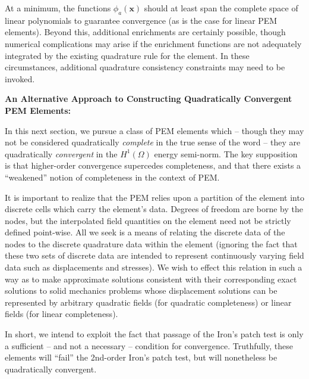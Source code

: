 \documentclass[11pt]{article} %
\begin{document}
At a minimum, the functions $\phi_a (\mathbf{x})$ should at least span the complete space of linear polynomials to guarantee convergence (as is the case for linear PEM elements). Beyond this, additional enrichments are certainly possible, though numerical complications may arise if the enrichment functions are not adequately integrated by the existing quadrature rule for the element. In these circumstances, additional quadrature consistency constraints may need to be invoked.

\newpage

\begin{center}
\textbf{An Alternative Approach to Constructing Quadratically Convergent PEM Elements:}
\end{center}

In this next section, we pursue a class of PEM elements which -- though they may not be considered quadratically \textit{complete} in the true sense of the word -- they are quadratically \textit{convergent} in the $H^1 (\Omega)$ energy semi-norm. The key supposition is that higher-order convergence supercedes completeness, and that there exists a ``weakened'' notion of completeness in the context of PEM.

It is important to realize that the PEM relies upon a partition of the element into discrete cells which carry the element's data. Degrees of freedom are borne by the nodes, but the interpolated field quantities on the element need not be strictly defined point-wise. All we seek is a means of relating the discrete data of the nodes to the discrete quadrature data within the element (ignoring the fact that these two sets of discrete data are intended to represent continuously varying field data such as displacements and stresses). We wish to effect this relation in such a way as to make approximate solutions consistent with their corresponding exact solutions to solid mechanics problems whose displacement solutions can be represented by arbitrary quadratic fields (for quadratic completeness) or linear fields (for linear completeness).

In short, we intend to exploit the fact that passage of the Iron's patch test is only a sufficient -- and not a necessary -- condition for convergence. Truthfully, these elements will ``fail'' the 2nd-order Iron's patch test, but will nonetheless be quadratically convergent.
\end{document}
